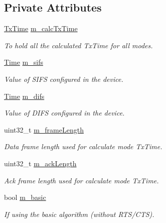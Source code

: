 \subsection*{Private Attributes}
\begin{DoxyCompactItemize}
\item 
\hyperlink{classns3_1_1RrpaaWifiManager_a4319a75b6c1316e6b389e7108da56918}{Tx\+Time} \hyperlink{classns3_1_1RrpaaWifiManager_a2d426c8e4e1b96b65c391660f63b0151}{m\+\_\+calc\+Tx\+Time}
\begin{DoxyCompactList}\small\item\em To hold all the calculated Tx\+Time for all modes. \end{DoxyCompactList}\item 
\hyperlink{classns3_1_1Time}{Time} \hyperlink{classns3_1_1RrpaaWifiManager_a023045edc295b2835d5d820b2a447978}{m\+\_\+sifs}
\begin{DoxyCompactList}\small\item\em Value of S\+I\+FS configured in the device. \end{DoxyCompactList}\item 
\hyperlink{classns3_1_1Time}{Time} \hyperlink{classns3_1_1RrpaaWifiManager_a1404a7f495fb692142ddf4ea93e00254}{m\+\_\+difs}
\begin{DoxyCompactList}\small\item\em Value of D\+I\+FS configured in the device. \end{DoxyCompactList}\item 
uint32\+\_\+t \hyperlink{classns3_1_1RrpaaWifiManager_ae5f18f7b27c353b749aaddf404c6b3df}{m\+\_\+frame\+Length}
\begin{DoxyCompactList}\small\item\em Data frame length used for calculate mode Tx\+Time. \end{DoxyCompactList}\item 
uint32\+\_\+t \hyperlink{classns3_1_1RrpaaWifiManager_a9af8ff237ac2e99e3c0e5d50285bdbb0}{m\+\_\+ack\+Length}
\begin{DoxyCompactList}\small\item\em Ack frame length used for calculate mode Tx\+Time. \end{DoxyCompactList}\item 
bool \hyperlink{classns3_1_1RrpaaWifiManager_a253f22b8b3fb9452a710ef9ab8dbbd30}{m\+\_\+basic}
\begin{DoxyCompactList}\small\item\em If using the basic algorithm (without R\+T\+S/\+C\+TS). \end{DoxyCompactList}\item 

\end{DoxyCompactItemize}
